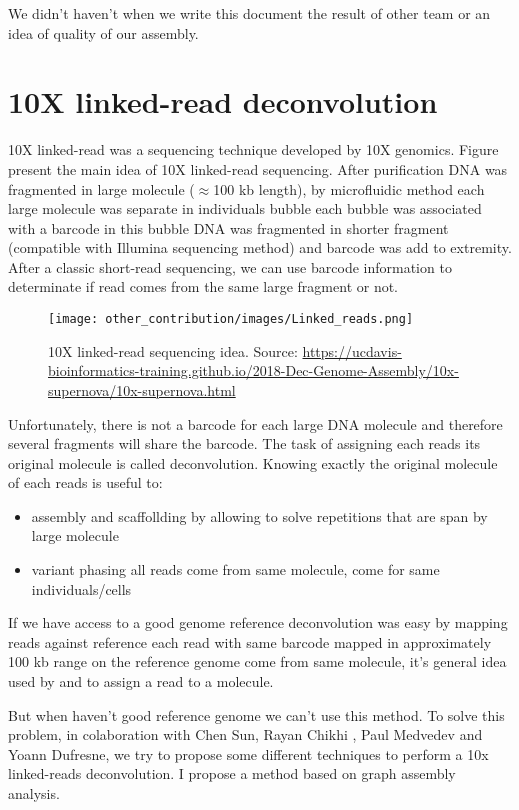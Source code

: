 \documentclass[main.tex]{subfiles}
\begin{document}
We didn't haven't when we write this document the result of other team or an idea of quality of our assembly.

\section{10X linked-read deconvolution}

10X linked-read was a sequencing technique developed by 10X genomics. Figure \label{fig:other_contribution:10x} present the main idea of 10X linked-read sequencing. After purification DNA was fragmented in large molecule ($\approx$100 kb length), by microfluidic method each large molecule was separate in individuals bubble each bubble was associated with a barcode in this bubble DNA was fragmented in shorter fragment (compatible with Illumina sequencing method) and barcode was add to extremity. After a classic short-read sequencing, we can use barcode information to determinate if read comes from the same large fragment or not.

\begin{figure}
    \centering
    \texttt{[image: other\_contribution/images/Linked\_reads.png]}
    \caption{10X linked-read sequencing idea. Source: \url{https://ucdavis-bioinformatics-training.github.io/2018-Dec-Genome-Assembly/10x-supernova/10x-supernova.html}}
    \label{fig:other_contribution:10x}
\end{figure}

Unfortunately, there is not a barcode for each large DNA molecule and therefore several fragments will share the barcode. The task of assigning each reads its original molecule is called deconvolution. Knowing exactly the original molecule of each reads is useful to: 
\begin{itemize}
    \item assembly and scaffollding by allowing to solve repetitions that are span by large molecule
    \item variant phasing all reads come from same molecule, come for same individuals/cells
\end{itemize}
 
If we have access to a good genome reference deconvolution was easy by mapping reads against reference each read with same barcode mapped in approximately 100 kb range on the reference genome come from same molecule, it's general idea used by \cite{ema} and \cite{lariat} to assign a read to a molecule.

But when haven't good reference genome we can't use this method. To solve this problem, in colaboration with Chen Sun, Rayan Chikhi , Paul Medvedev and Yoann Dufresne, we try to propose some different techniques to perform a 10x linked-reads deconvolution. I propose a method based on graph assembly analysis.
\end{document}
